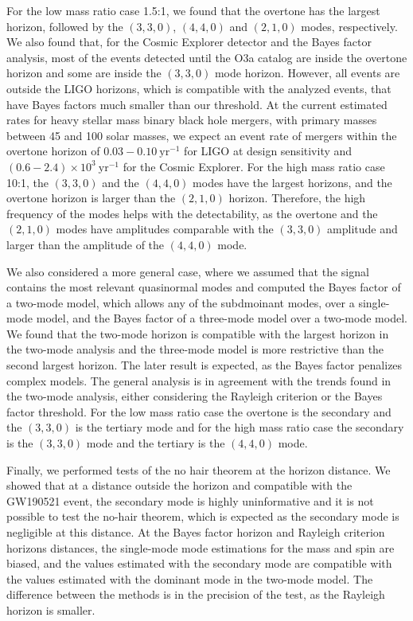 \documentclass[a4paper]{article}
\begin{document}
For the low mass ratio case 1.5:1, we found that the overtone has the largest horizon, followed by the $(3,3,0)$, $(4,4,0)$ and $(2,1,0)$ modes, respectively.
We also found that, for the Cosmic Explorer detector and the Bayes factor analysis, most of the events detected until the O3a catalog are inside the overtone horizon and some are inside the $(3,3,0)$ mode horizon.
However, all events are outside the LIGO horizons, which is compatible with the analyzed events, that have Bayes factors much smaller than our threshold.
At the current estimated rates for heavy stellar mass binary black hole mergers, with primary masses between 45 and 100 solar masses, we expect an event rate of mergers within the overtone  horizon of $0.03 − 0.10 \ \mathrm{yr}^{-1}$ for LIGO at design sensitivity and $(0.6 − 2.4) \times 10^3 \ \mathrm{yr}^{-1}$ for the Cosmic Explorer.
For the high mass ratio case 10:1, the $(3,3,0)$ and the $(4,4,0)$ modes have the largest horizons, and the overtone horizon is larger than the $(2,1,0)$ horizon.
Therefore, the high frequency of the modes helps with the detectability, as the overtone and the $(2,1,0)$ modes have amplitudes comparable with the $(3,3,0)$ amplitude and larger than the amplitude of the $(4,4,0)$ mode.

We also considered a more general case, where we assumed that the signal contains the most relevant quasinormal modes and computed the Bayes factor of a two-mode model, which allows any of the subdmoinant modes, over a single-mode model, and the Bayes factor of a three-mode model over a two-mode model.
We found that the two-mode horizon is compatible with the largest horizon in the two-mode analysis and the three-mode model is more restrictive than the second largest horizon. 
The later result is expected, as the Bayes factor penalizes complex models. 
The general analysis is in agreement with the trends found in the two-mode analysis, either considering the Rayleigh criterion or the Bayes factor threshold.
For the low mass ratio case the overtone is the secondary and the $(3,3,0)$ is the tertiary mode and for the high mass ratio case the secondary is the $(3,3,0)$ mode and the tertiary is the $(4,4,0)$ mode.

Finally, we performed tests of the no hair theorem at the horizon distance. 
We showed that at a distance outside the horizon and compatible with the GW190521 event, the secondary mode is highly uninformative and it is not possible to test the no-hair theorem, which is expected as the secondary mode is negligible at this distance.
At the Bayes factor horizon and Rayleigh criterion horizons distances, the single-mode mode estimations for the mass and spin are biased, and the values estimated with the secondary mode are compatible with the values estimated with the dominant mode in the two-mode model. 
The difference between the methods  is in the precision of the test, as the Rayleigh horizon is smaller.
\end{document}
